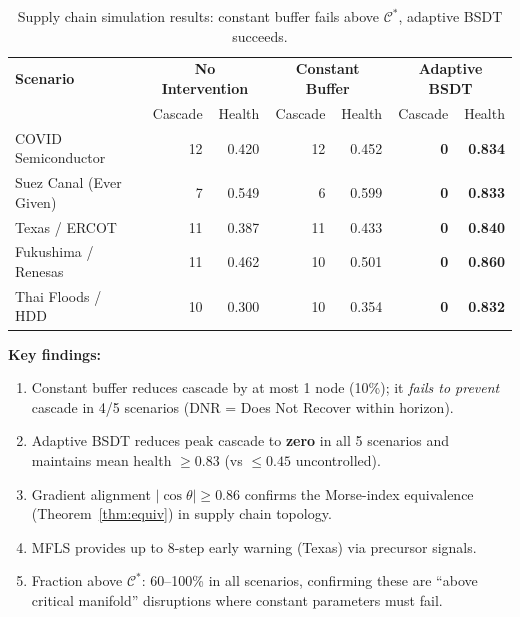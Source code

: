\documentclass[11pt,a4paper]{article}
\newcommand{\Cman}{\mathcal{C}^*}
\begin{document}
\begin{table}[H]
\centering
\caption{Supply chain simulation results: constant buffer fails above $\Cman$, adaptive BSDT succeeds.}
\label{tab:supply-chain-results}
\small
\begin{tabular}{@{}lrrrrrr@{}}
\toprule
\textbf{Scenario} & \multicolumn{2}{c}{\textbf{No Intervention}} & \multicolumn{2}{c}{\textbf{Constant Buffer}} & \multicolumn{2}{c}{\textbf{Adaptive BSDT}} \\
& Cascade & Health & Cascade & Health & Cascade & Health \\
\midrule
COVID Semiconductor & 12 & 0.420 & 12 & 0.452 & \textbf{0} & \textbf{0.834} \\
Suez Canal (Ever Given) & 7 & 0.549 & 6 & 0.599 & \textbf{0} & \textbf{0.833} \\
Texas / ERCOT & 11 & 0.387 & 11 & 0.433 & \textbf{0} & \textbf{0.840} \\
Fukushima / Renesas & 11 & 0.462 & 10 & 0.501 & \textbf{0} & \textbf{0.860} \\
Thai Floods / HDD & 10 & 0.300 & 10 & 0.354 & \textbf{0} & \textbf{0.832} \\
\bottomrule
\end{tabular}
\end{table}

\textbf{Key findings:}
\begin{enumerate}[nosep]
  \item Constant buffer reduces cascade by at most 1 node (10\%); it \emph{fails to prevent}
        cascade in 4/5 scenarios (DNR = Does Not Recover within horizon).
  \item Adaptive BSDT reduces peak cascade to \textbf{zero} in all 5 scenarios and
        maintains mean health $\ge 0.83$ (vs $\le 0.45$ uncontrolled).
  \item Gradient alignment $|\cos\theta| \ge 0.86$ confirms the
        Morse-index equivalence (Theorem~\ref{thm:equiv}) in supply chain topology.
  \item MFLS provides up to 8-step early warning (Texas) via precursor signals.
  \item Fraction above $\Cman$: 60--100\% in all scenarios, confirming these are
        ``above critical manifold'' disruptions where constant parameters must fail.
\end{enumerate}


\end{document}
